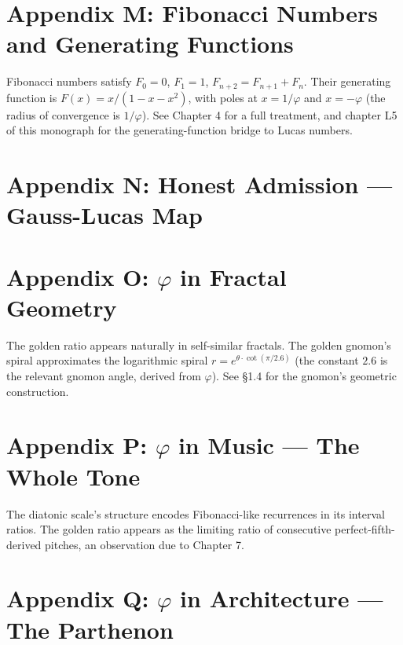 \section*{Appendix M: Fibonacci Numbers and Generating Functions}
\label{sec:01-app-M}

Fibonacci numbers satisfy $F_0 = 0$, $F_1 = 1$, $F_{n+2} = F_{n+1} +
F_n$. Their generating function is $F(x) = x / (1 - x - x^2)$, with
poles at $x = 1/\varphi$ and $x = -\varphi$ (the radius of
convergence is $1/\varphi$). See \cite{koshy_fib_lucas} Chapter 4
for a full treatment, and chapter L5 of this monograph for the
generating-function bridge to Lucas numbers.

\section*{Appendix N: Honest Admission --- Gauss-Lucas Map}
\label{sec:01-app-N}


\section*{Appendix O: $\varphi$ in Fractal Geometry}
\label{sec:01-app-O}

The golden ratio appears naturally in self-similar fractals. The
golden gnomon's spiral approximates the logarithmic spiral $r =
e^{\theta \cdot \cot(\pi/2.6)}$ (the constant $2.6$ is the relevant
gnomon angle, derived from $\varphi$). See
\cite{coxeter_regular_polytopes} \S 1.4 for the gnomon's geometric
construction.

\section*{Appendix P: $\varphi$ in Music --- The Whole Tone}
\label{sec:01-app-P}

The diatonic scale's structure encodes Fibonacci-like recurrences in
its interval ratios. The golden ratio appears as the limiting ratio
of consecutive perfect-fifth-derived pitches, an observation due to
\cite{livio_phi} Chapter 7.

\section*{Appendix Q: $\varphi$ in Architecture --- The Parthenon}
\label{sec:01-app-Q}

